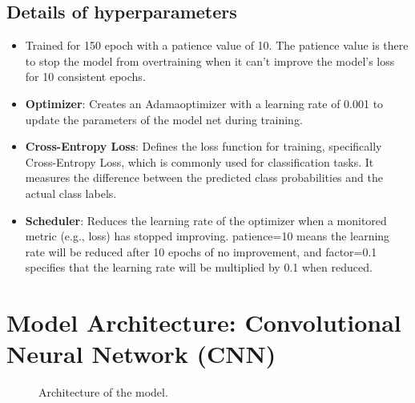 \documentclass[a4paper,oneside,11pt]{book}
\begin{document}
\subsection{Details of hyperparameters}
\begin{itemize}
    \item Trained for 150 epoch with a patience value of 10. The patience value is there to stop the model from overtraining when it can't improve the model's loss for 10 consistent epochs.
    \item \textbf{Optimizer}: Creates an Adamaoptimizer with a learning rate of 0.001 to update the parameters of the model net during training.
    \item \textbf{Cross-Entropy Loss}: Defines the loss function for training, specifically Cross-Entropy Loss, which is commonly used for classification tasks. It measures the difference between the predicted class probabilities and the actual class labels.
    \item \textbf{Scheduler}:  Reduces the learning rate of the optimizer when a monitored metric (e.g., loss) has stopped improving. patience=10 means the learning rate will be reduced after 10 epochs of no improvement, and factor=0.1 specifies that the learning rate will be multiplied by 0.1 when reduced.
\end{itemize}
\section{Model Architecture: Convolutional Neural Network (CNN)}
\begin{figure}[H]
    \centering
    \caption{Architecture of the model.}
\end{figure}
\end{document}
